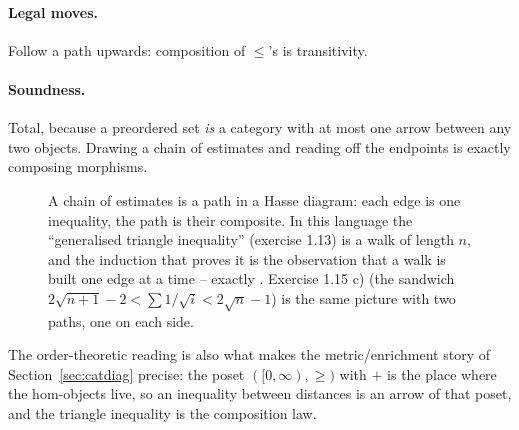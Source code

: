 \paragraph{Legal moves.} Follow a path upwards: composition of $\le$'s is transitivity.
\paragraph{Soundness.} Total, because a preordered set \emph{is} a category with at most
one arrow between any two objects. Drawing a chain of estimates and reading off the
endpoints is exactly composing morphisms.

\begin{figure}[H]
\centering
{}
\qquad
{}
\caption{A chain of estimates is a path in a Hasse diagram: each edge is one inequality,
the path is their composite. In this language the ``generalised triangle inequality''
(exercise 1.13) is a walk of length $n$, and the induction that proves it is the
observation that a walk is built one edge at a time -- exactly
. Exercise 1.15 c) (the sandwich
$2\sqrt{n+1}-2<\sum 1/\sqrt i<2\sqrt n-1$) is the same picture with two paths, one on
each side.}
\label{fig:hasse}
\end{figure}

The order-theoretic reading is also what makes the metric/enrichment story of
Section~\ref{sec:catdiag} precise: the poset $([0,\infty),\ge)$ with $+$ is the place
where the hom-objects live, so an inequality between distances is an arrow of that poset,
and the triangle inequality is the composition law.


